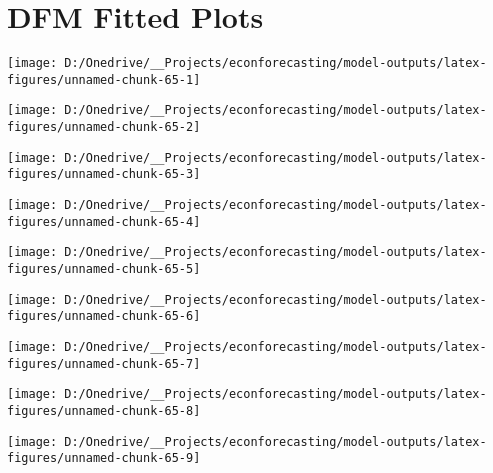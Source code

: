 \documentclass[11pt, letterpaper]{article}\usepackage[]{graphicx}\usepackage[]{color}
\begin{document}
\appendix
\appendixpage
\addappheadtotoc

\section{DFM Fitted Plots}


{\centering \texttt{[image: D:/Onedrive/\_\_Projects/econforecasting/model-outputs/latex-figures/unnamed-chunk-65-1]} 

}




{\centering \texttt{[image: D:/Onedrive/\_\_Projects/econforecasting/model-outputs/latex-figures/unnamed-chunk-65-2]} 

}




{\centering \texttt{[image: D:/Onedrive/\_\_Projects/econforecasting/model-outputs/latex-figures/unnamed-chunk-65-3]} 

}




{\centering \texttt{[image: D:/Onedrive/\_\_Projects/econforecasting/model-outputs/latex-figures/unnamed-chunk-65-4]} 

}




{\centering \texttt{[image: D:/Onedrive/\_\_Projects/econforecasting/model-outputs/latex-figures/unnamed-chunk-65-5]} 

}




{\centering \texttt{[image: D:/Onedrive/\_\_Projects/econforecasting/model-outputs/latex-figures/unnamed-chunk-65-6]} 

}




{\centering \texttt{[image: D:/Onedrive/\_\_Projects/econforecasting/model-outputs/latex-figures/unnamed-chunk-65-7]} 

}




{\centering \texttt{[image: D:/Onedrive/\_\_Projects/econforecasting/model-outputs/latex-figures/unnamed-chunk-65-8]} 

}




{\centering \texttt{[image: D:/Onedrive/\_\_Projects/econforecasting/model-outputs/latex-figures/unnamed-chunk-65-9]} 

}
\end{document}
